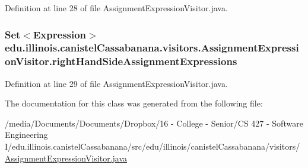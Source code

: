 Definition at line 28 of file AssignmentExpressionVisitor.java.

\hypertarget{classedu_1_1illinois_1_1canistelCassabanana_1_1visitors_1_1AssignmentExpressionVisitor_a8cb4c3612d7c07ef325acdeff6401101}{
\subsubsection[{rightHandSideAssignmentExpressions}]{\setlength{\rightskip}{0pt plus 5cm}Set$<$Expression$>$ {\bf edu.illinois.canistelCassabanana.visitors.AssignmentExpressionVisitor.rightHandSideAssignmentExpressions}}}
\label{classedu_1_1illinois_1_1canistelCassabanana_1_1visitors_1_1AssignmentExpressionVisitor_a8cb4c3612d7c07ef325acdeff6401101}


Definition at line 29 of file AssignmentExpressionVisitor.java.



The documentation for this class was generated from the following file:\begin{DoxyCompactItemize}
\item 
/media/Documents/Documents/Dropbox/16 -\/ College -\/ Senior/CS 427 -\/ Software Engineering I/edu.illinois.canistelCassabanana/src/edu/illinois/canistelCassabanana/visitors/\hyperlink{AssignmentExpressionVisitor_8java}{AssignmentExpressionVisitor.java}\end{DoxyCompactItemize}
